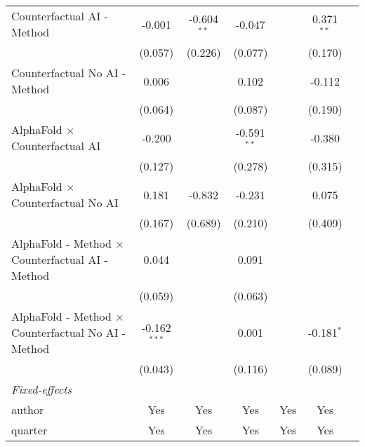 \begin{tabular}{lcccccc}
   Counterfactual AI - Method                                 & -0.001         & -0.604$^{**}$ & -0.047        &         & 0.371$^{**}$ &   \\   
                                                              & (0.057)        & (0.226)       & (0.077)       &         & (0.170)      &   \\   
   Counterfactual No AI - Method                              & 0.006          &               & 0.102         &         & -0.112       &   \\   
                                                              & (0.064)        &               & (0.087)       &         & (0.190)      &   \\   
   AlphaFold $\times$ Counterfactual AI                       & -0.200         &               & -0.591$^{**}$ &         & -0.380       &   \\   
                                                              & (0.127)        &               & (0.278)       &         & (0.315)      &   \\   
   AlphaFold $\times$ Counterfactual No AI                    & 0.181          & -0.832        & -0.231        &         & 0.075        &   \\   
                                                              & (0.167)        & (0.689)       & (0.210)       &         & (0.409)      &   \\   
   AlphaFold - Method $\times$ Counterfactual AI - Method     & 0.044          &               & 0.091         &         &              &   \\   
                                                              & (0.059)        &               & (0.063)       &         &              &   \\   
   AlphaFold - Method $\times$ Counterfactual No AI - Method  & -0.162$^{***}$ &               & 0.001         &         & -0.181$^{*}$ &   \\   
                                                              & (0.043)        &               & (0.116)       &         & (0.089)      &   \\   
   \midrule
   \emph{Fixed-effects}\\
   author                                                     & Yes            & Yes           & Yes           & Yes     & Yes          & \\  
   quarter                                                    & Yes            & Yes           & Yes           & Yes     & Yes          & \\  

\end{tabular}

